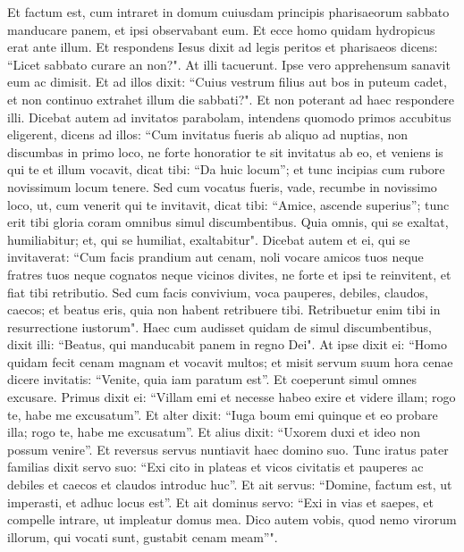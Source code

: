 \begin{biblechapter}  
\verse Et factum est, cum intraret in domum cuiusdam principis pharisaeorum sabbato manducare panem, et ipsi observabant eum. 
\verse Et ecce homo quidam hydropicus erat ante illum. 
\verse Et respondens Iesus dixit ad legis peritos et pharisaeos dicens: “Licet sabbato curare an non?". 
\verse At illi tacuerunt. Ipse vero apprehensum sanavit eum ac dimisit. 
\verse Et ad illos dixit: “Cuius vestrum filius aut bos in puteum cadet, et non continuo extrahet illum die sabbati?". 
\verse Et non poterant ad haec respondere illi. 
\verse Dicebat autem ad invitatos parabolam, intendens quomodo primos accubitus eligerent, dicens ad illos: 
\verse “Cum invitatus fueris ab aliquo ad nuptias, non discumbas in primo loco, ne forte honoratior te sit invitatus ab eo, 
\verse et veniens is qui te et illum vocavit, dicat tibi: “Da huic locum”; et tunc incipias cum rubore novissimum locum tenere. 
\verse Sed cum vocatus fueris, vade, recumbe in novissimo loco, ut, cum venerit qui te invitavit, dicat tibi: “Amice, ascende superius”; tunc erit tibi gloria coram omnibus simul discumbentibus. 
\verse Quia omnis, qui se exaltat, humiliabitur; et, qui se humiliat, exaltabitur". 
\verse Dicebat autem et ei, qui se invitaverat: “Cum facis prandium aut cenam, noli vocare amicos tuos neque fratres tuos neque cognatos neque vicinos divites, ne forte et ipsi te reinvitent, et fiat tibi retributio. 
\verse Sed cum facis convivium, voca pauperes, debiles, claudos, caecos; 
\verse et beatus eris, quia non habent retribuere tibi. Retribuetur enim tibi in resurrectione iustorum". 
\verse Haec cum audisset quidam de simul discumbentibus, dixit illi: “Beatus, qui manducabit panem in regno Dei". 
\verse At ipse dixit ei: “Homo quidam fecit cenam magnam et vocavit multos; 
\verse et misit servum suum hora cenae dicere invitatis: “Venite, quia iam paratum est”. 
\verse Et coeperunt simul omnes excusare. Primus dixit ei: “Villam emi et necesse habeo exire et videre illam; rogo te, habe me excusatum”. 
\verse Et alter dixit: “Iuga boum emi quinque et eo probare illa; rogo te, habe me excusatum”. 
\verse Et alius dixit: “Uxorem duxi et ideo non possum venire”. 
\verse Et reversus servus nuntiavit haec domino suo. Tunc iratus pater familias dixit servo suo: “Exi cito in plateas et vicos civitatis et pauperes ac debiles et caecos et claudos introduc huc”. 
\verse Et ait servus: “Domine, factum est, ut imperasti, et adhuc locus est”. 
\verse Et ait dominus servo: “Exi in vias et saepes, et compelle intrare, ut impleatur domus mea. 
\verse Dico autem vobis, quod nemo virorum illorum, qui vocati sunt, gustabit cenam meam”". 

\end{biblechapter}
